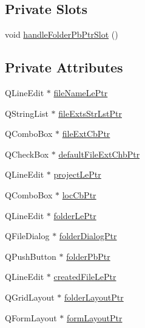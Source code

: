 \subsection*{Private Slots}
\begin{DoxyCompactItemize}
\item 
void \hyperlink{class_new_file_page__4_a91657445dacedc44590c5ab9f270fb55}{handle\-Folder\-Pb\-Ptr\-Slot} ()
\end{DoxyCompactItemize}
\subsection*{Private Attributes}
\begin{DoxyCompactItemize}
\item 
Q\-Line\-Edit $\ast$ \hyperlink{class_new_file_page__4_a145cc995d3737d3d73ad1ed18c91492c}{file\-Name\-Le\-Ptr}
\item 
Q\-String\-List $\ast$ \hyperlink{class_new_file_page__4_a33598f1f6153aa6c94c6100ff5864b3a}{file\-Exts\-Str\-Lst\-Ptr}
\item 
Q\-Combo\-Box $\ast$ \hyperlink{class_new_file_page__4_afd3b7539e238b941bb03f981f087ed46}{file\-Ext\-Cb\-Ptr}
\item 
Q\-Check\-Box $\ast$ \hyperlink{class_new_file_page__4_a3d192a050512836a080dab3b1cdf3387}{default\-File\-Ext\-Chb\-Ptr}
\item 
Q\-Line\-Edit $\ast$ \hyperlink{class_new_file_page__4_a1373433031aa8284d1e4b597b2b3ef5f}{project\-Le\-Ptr}
\item 
Q\-Combo\-Box $\ast$ \hyperlink{class_new_file_page__4_afd3456441e46868a662023c1f162c7c0}{loc\-Cb\-Ptr}
\item 
Q\-Line\-Edit $\ast$ \hyperlink{class_new_file_page__4_aa502f56ce180d904bbb70be9409d7ef6}{folder\-Le\-Ptr}
\item 
Q\-File\-Dialog $\ast$ \hyperlink{class_new_file_page__4_a4d3e4936410b7c135b1150b7840bc411}{folder\-Dialog\-Ptr}
\item 
Q\-Push\-Button $\ast$ \hyperlink{class_new_file_page__4_ac1b396af8e82371912cbfa03250bd820}{folder\-Pb\-Ptr}
\item 
Q\-Line\-Edit $\ast$ \hyperlink{class_new_file_page__4_a34ae0bfeb34f323cc34ae16a9df9ce28}{created\-File\-Le\-Ptr}
\item 
Q\-Grid\-Layout $\ast$ \hyperlink{class_new_file_page__4_ae35f4a21e38b5d0849b580bc45b1af6d}{folder\-Layout\-Ptr}
\item 
Q\-Form\-Layout $\ast$ \hyperlink{class_new_file_page__4_a136ab5da5a948efa9b0aad4460f89825}{form\-Layout\-Ptr}

\end{DoxyCompactItemize}
